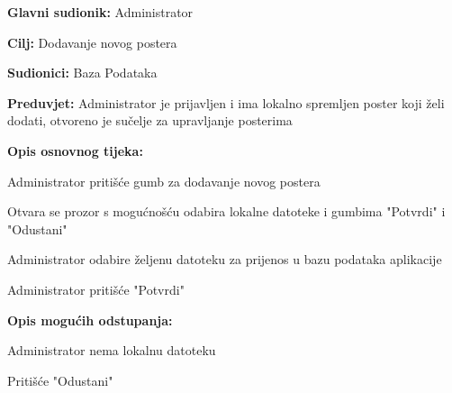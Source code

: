 					\noindent {}
					\begin{packed_item}
						
						\item \textbf{Glavni sudionik: } Administrator
						\item  \textbf{Cilj:} Dodavanje novog postera
						\item  \textbf{Sudionici:} Baza Podataka
						\item  \textbf{Preduvjet:} Administrator je prijavljen i ima lokalno spremljen poster koji želi dodati, otvoreno je sučelje za upravljanje posterima
						\item  \textbf{Opis osnovnog tijeka:}
						
						\item[] \begin{packed_enum}
							
							\item Administrator pritišće gumb za dodavanje novog postera
							\item Otvara se prozor s mogućnošću odabira lokalne datoteke i gumbima "Potvrdi" i "Odustani"
							\item Administrator odabire željenu datoteku za prijenos u bazu podataka aplikacije
							\item Administrator pritišće "Potvrdi"
						\end{packed_enum}
						
						\item  \textbf{Opis mogućih odstupanja:}
						
						\item[] \begin{packed_item}
							
							\item[2.a] Administrator nema lokalnu datoteku
							\item[] \begin{packed_enum}
								
								\item Pritišće "Odustani"
							\end{packed_enum}
							
						\end{packed_item}
					\end{packed_item}
					
